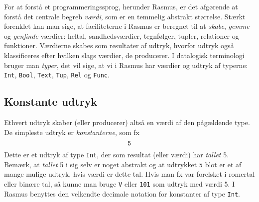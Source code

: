 For at forst\aa{} et 
programmeringssprog, herunder {\sc Rasmus}, er det 
afg\o{}rende at forst\aa{}
det centrale begreb {\em v\ae{}rdi}, som er en temmelig abstrakt
st\o{}rrelse. St\ae{}rkt forenklet kan man sige, at faciliteterne i
{\sc Rasmus} er beregnet til at {\em skabe}, {\em gemme\/}
og {\em genfinde\/} v\ae{}rdier: heltal, sandhedsv\ae{}rdier,
tegnf\o{}lger, tupler, relationer og funktioner.
V\ae{}rdierne skabes som resultater af udtryk, hvorfor udtryk ogs\aa{}
klassificeres efter hvilken slags v\ae{}rdier, de producerer.
I datalogisk terminologi bruger man {\em typer}, det vil sige,
at vi i {\sc Rasmus} har v\ae{}rdier og udtryk af typerne:
\verb"Int", \verb"Bool", \verb"Text", \verb"Tup", \verb"Rel" og \verb"Func".

\subsection{Konstante udtryk}
Ethvert udtryk skaber (eller producerer) alts\aa{} en v\ae{}rdi af den
p\aa{}g\ae{}ldende type. De simpleste udtryk er {\em konstanterne},
som fx
$$\mbox{\tt 5}$$
Dette er et udtryk af type \verb"Int", der som resultat (eller v\ae{}rdi)
har {\em tallet\/} 5. Bem\ae{}rk, at {\em tallet\/} 5 i sig selv er noget
abstrakt og at udtrykket {\tt 5} blot er et af mange mulige udtryk, hvis
v\ae{}rdi er dette tal. Hvis man fx var forelsket i romertal eller
bin\ae{}re tal, s\aa{} kunne man bruge \verb"V" eller \verb"101" som
udtryk med v\ae{}rdi 5. I {\sc Rasmus} benyttes den velkendte decimale
notation for konstanter af type \verb"Int".

